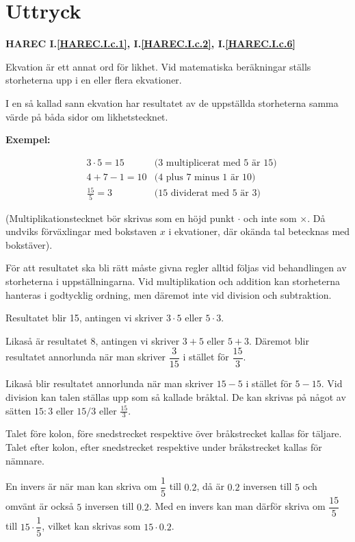 \section{Uttryck}
\textbf{HAREC
  I.\ref{HAREC.I.c.1}\label{myHAREC.I.c.1},
  I.\ref{HAREC.I.c.2}\label{myHAREC.I.c.2},
  I.\ref{HAREC.I.c.6}\label{myHAREC.I.c.6}
}

Ekvation är ett annat ord för likhet.
Vid matematiska beräkningar ställs storheterna upp i en eller flera ekvationer.

I en så kallad sann ekvation har resultatet av de uppställda storheterna samma
värde på båda sidor om likhetstecknet.

\textbf{Exempel:}

\begin{align*}
 & 3 \cdot 5 = 15   & \text{(3 multiplicerat med 5 är 15)} \\
 & 4 + 7 - 1 = 10   & \text{(4 plus 7 minus 1 är 10)}      \\
 & \frac{15}{5} = 3 & \text{(15 dividerat med 5 är 3)}
\end{align*}

(Multiplikationstecknet bör skrivas som en höjd punkt \(\cdot\) och inte som
\(\times\).
Då undviks förväxlingar med bokstaven \(x\) i ekvationer, där okända tal
betecknas med bokstäver).

För att resultatet ska bli rätt måste givna regler alltid följas vid
behandlingen av storheterna i uppställningarna.
Vid multiplikation och addition kan storheterna hanteras i godtycklig ordning,
men däremot inte vid division och subtraktion.

Resultatet blir 15, antingen vi skriver \(3 \cdot 5\) eller \(5 \cdot 3\).

Likaså är resultatet 8, antingen vi skriver \(3 + 5\) eller \(5 + 3\).
Däremot blir resultatet annorlunda när man skriver \(\dfrac{3}{15}\) i stället
för \(\dfrac{15}{3}\).

Likaså blir resultatet annorlunda när man skriver \(15 - 5\) i stället för
\(5 - 15\).
Vid division kan talen ställas upp som så kallade bråktal.
De kan skrivas på något av sätten \(15:3\) eller \(15/3\) eller
\(\frac{15}{3}\).

Talet före kolon, före snedstrecket respektive över bråkstrecket kallas för
täljare.
Talet efter kolon, efter snedstrecket respektive under bråkstrecket kallas för
nämnare.

En invers är när man kan skriva om \(\dfrac{1}{5}\) till \(0.2\), då är
\(0.2\) inversen till \(5\) och omvänt är också \(5\) inversen till \(0.2\).
Med en invers kan man därför skriva om \(\dfrac{15}{5}\) till
\(15 \cdot \dfrac{1}{5}\), vilket kan skrivas som  \(15 \cdot 0.2\).

